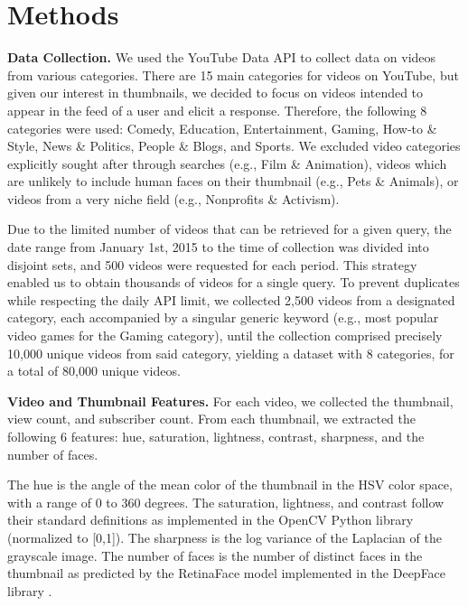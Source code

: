 \documentclass{article}
\begin{document}
\section{Methods}
\textbf{Data Collection.} We used the YouTube Data API \cite{youtubeapi} to collect data on videos from various categories. There are 15 main categories for videos on YouTube, but given our interest in thumbnails, we decided to focus on videos intended to appear in the feed of a user and elicit a response. Therefore, the following 8 categories were used: Comedy, Education, Entertainment, Gaming, How-to \& Style, News \& Politics, People \& Blogs, and Sports. We excluded video categories explicitly sought after through searches (e.g., Film \& Animation), videos which are unlikely to include human faces on their thumbnail (e.g., Pets \& Animals), or videos from a very niche field (e.g., Nonprofits \& Activism).

Due to the limited number of videos that can be retrieved for a given query, the date range from January 1st, 2015 to the time of collection was divided into disjoint sets, and 500 videos were requested for each period. This strategy enabled us to obtain thousands of videos for a single query. To prevent duplicates while respecting the daily API limit, we collected 2,500 videos from a designated category, each accompanied by a singular generic keyword (e.g., most popular video games for the Gaming category), until the collection comprised precisely 10,000 unique videos from said category, yielding a dataset with 8 categories, for a total of 80,000 unique videos.




\textbf{Video and Thumbnail Features.} For each video, we collected the thumbnail, view count, and subscriber count. From each thumbnail, we extracted the following 6 features: hue, saturation, lightness, contrast, sharpness, and the number of faces.

The hue is the angle of the mean color of the thumbnail in the HSV color space, with a range of 0 to 360 degrees. The saturation, lightness, and contrast follow their standard definitions as implemented in the OpenCV Python library (normalized to [0,1]). The sharpness is the log variance of the Laplacian of the grayscale image. The number of faces is the number of distinct faces in the thumbnail as predicted by the RetinaFace model implemented in the DeepFace library \cite{serengil2024lightface,serengil2020lightface}.
\end{document}
